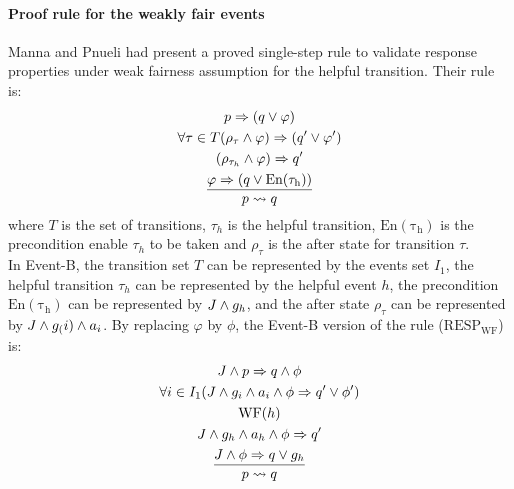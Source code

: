 \paragraph{Proof rule for the weakly fair events}
Manna and Pnueli had present a proved single-step rule to validate response properties under weak fairness assumption for the helpful transition. Their rule is:
\begin{gather*}
  p\Rightarrow({q}\vee\varphi)\\
  \forall{\tau}\in{T}(\rho_{\tau}\wedge\varphi)\Rightarrow({q'}\vee\varphi')\\
  (\rho_{\tau_{h}}\wedge\varphi)\Rightarrow{q'}\\
  \frac{\varphi\Rightarrow({q}\vee\mathrm{En(\tau_{h})})}{p\rightsquigarrow{q}}
\end{gather*}
where $T$ is the set of transitions, $\tau_{h}$ is the helpful transition, $\mathrm{En(\tau_{h})}$ is the precondition enable $\tau_{h}$ to be taken and $\rho_{\tau}$ is the after state for transition $\tau$.\\
In Event-B, the transition set $T$ can be represented by the events set $I_1$, the helpful transition $\tau_{h}$ can be represented by the helpful event $h$, the precondition $\mathrm{En(\tau_{h})}$ can be represented by $J\wedge{g_{h}}$, and the after state $\rho_{\tau}$ can be represented by $J\wedge{g_(i)}\wedge{a_{i}}$. By replacing $\varphi$ by $\phi$, the Event-B version of the rule (\texttt{$\mathrm{RESP_{WF}}$}) is:
\begin{gather*}
  {J}\wedge{p}\Rightarrow{q}\wedge\phi\\
  \forall{i}\in{I_1}({J}\wedge{g_{i}}\wedge{a_{i}}\wedge\phi\Rightarrow{q'}\vee\phi')\\
  \mathrm{WF}(h)\\
  {J}\wedge{g_{h}}\wedge{a_{h}}\wedge\phi\Rightarrow{q'}\\
  \frac{{J}\wedge\phi\Rightarrow{q}\vee{g_{h}}}{p\rightsquigarrow{q}}
\end{gather*}
